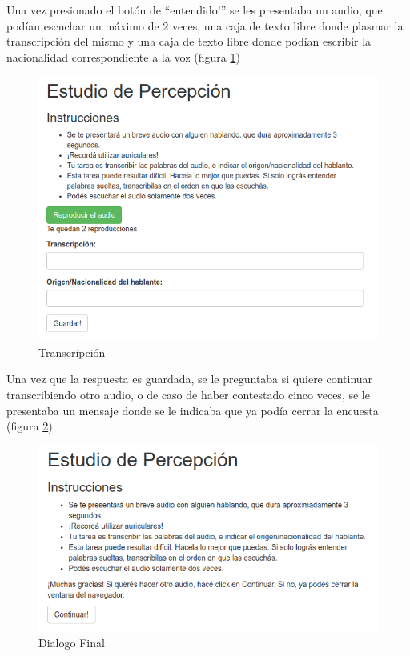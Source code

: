 Una vez presionado el botón de ``entendido!'' se les presentaba un audio, que podían escuchar un máximo de $2$ veces, una caja de texto libre donde plasmar la transcripción del mismo y una caja de texto libre donde podían escribir la nacionalidad correspondiente a la voz (figura \ref{transcripcion})

\begin{figure}
\begin{center}
\includegraphics[scale=0.6]{estudio_online/estudio3.png}
\end{center}
\caption{Transcripción}
\label{transcripcion}
\end{figure}

Una vez que la respuesta es guardada, se le preguntaba si quiere continuar transcribiendo otro audio, o de caso de haber contestado cinco veces, se le presentaba un mensaje donde se le indicaba que ya podía cerrar la encuesta (figura \ref{continuar}).

\begin{figure}
\begin{center}
\includegraphics[scale=0.6]{estudio_online/estudio4.png}
\end{center}
\caption{Dialogo Final}
\label{continuar}
\end{figure}